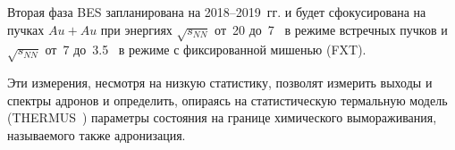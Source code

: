 
Вторая фаза BES запланирована на 2018--2019~гг. и будет сфокусирована на пучках $Au+Au$ при энергиях $\sqrt{s_{NN}}$ от~20 до~7~\GeVperNucl{} в режиме встречных пучков и $\sqrt{s_{NN}}$ от~7 до~3.5~\GeVperNucl{} в режиме с фиксированной мишенью (FXT).






Эти измерения, несмотря на низкую статистику, позволят измерить выходы и спектры адронов и определить, опираясь на статистическую термальную модель (THERMUS~\cite{}) параметры состояния на границе химического вымораживания, называемого также адронизация.





